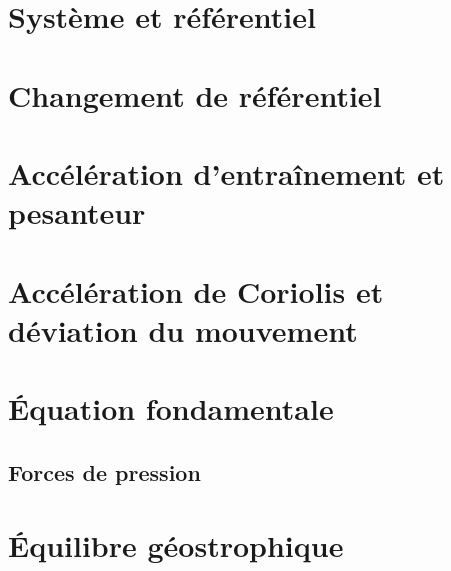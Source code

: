\documentclass[a4paper,DIV16,10pt]{scrartcl}
\begin{document}
%
%


\newpage \section{Système et référentiel} 

\newpage \section{Changement de référentiel} 

\newpage \section{Accélération d'entraînement et pesanteur} 

\newpage \section{Accélération de Coriolis et déviation du mouvement} 


\newpage \section{\'Equation fondamentale}  \begin{detail} \section{Forces de pression}  \end{detail}

\newpage \section{\'Equilibre géostrophique} 
\end{document}
